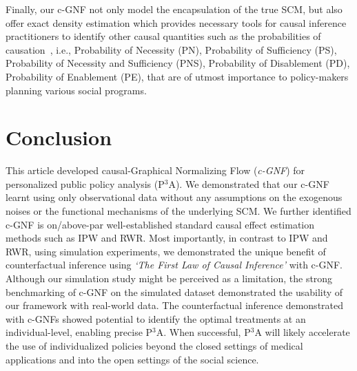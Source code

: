\documentclass[letterpaper]{article} %
\begin{document}
Finally, our c-GNF not only model the encapsulation of the true SCM, but also offer exact density estimation which provides necessary tools for causal inference practitioners to identify other causal quantities such as
the probabilities of causation~\cite{pearl1999probabilitiesofcausation, pearl2009causality}, i.e., Probability of Necessity (PN), Probability of Sufficiency (PS), Probability of Necessity and Sufficiency (PNS), Probability of Disablement (PD), Probability of Enablement (PE),
that are of utmost importance to policy-makers planning various social programs.%



















\section{Conclusion}\label{sec:conclusion}

This article developed causal-Graphical Normalizing Flow (\emph{c-GNF}) for personalized public policy analysis (P$^3$A). We demonstrated that our c-GNF learnt using only observational data without any assumptions on the exogenous noises or the functional mechanisms of the underlying SCM.%
We further identified c-GNF is on/above-par well-established standard causal effect estimation methods such as IPW and RWR.
Most importantly, in contrast to IPW and RWR, using simulation experiments, we demonstrated the unique benefit of counterfactual inference using \emph{`The First Law of Causal Inference'} with c-GNF. Although our simulation study might be perceived as a limitation, the strong benchmarking of c-GNF on the simulated dataset demonstrated the usability of our framework with real-world data.
The counterfactual inference demonstrated with c-GNFs showed potential to identify the optimal treatments at an individual-level, enabling precise P$^3$A. When successful, P$^3$A will likely accelerate the use of individualized policies beyond the closed settings of medical applications and into the open settings of the social science.
\end{document}

